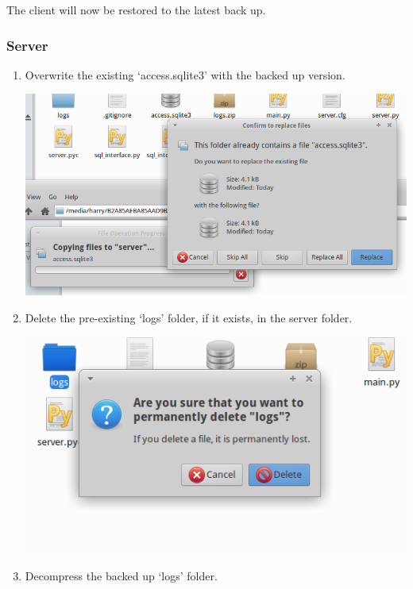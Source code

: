 \documentclass[a4paper]{article}
\begin{document}
\begin{enumerate}
\begin{center}
                \end{center}
            \end{enumerate}
            The client will now be restored to the latest back up.
        \newpage
        \subsubsection{Server}
            \begin{enumerate}
                \item Overwrite the existing `access.sqlite3' with the backed up version.
                \begin{center}
                \includegraphics[scale=0.5]{../shared_assets/screenshots/manual/serveroverwritedb.png}
                \end{center}
                \item Delete the pre-existing `logs' folder, if it exists, in the server folder.
                \begin{center}
                \includegraphics[scale=0.7]{../shared_assets/screenshots/manual/serverlogdelete.png}
                \end{center}
                \item Decompress the backed up `logs' folder.


\end{enumerate}
\end{document}
